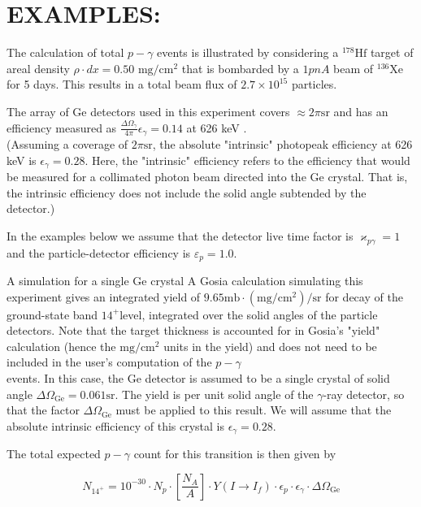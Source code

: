 \documentclass[10pt]{article}
\begin{document}
\section*{EXAMPLES:}
The calculation of total $p-\gamma$ events is illustrated by considering a ${ }^{178} \mathrm{Hf}$ target of areal density $\rho \cdot d x=0.50$ $\mathrm{mg} / \mathrm{cm}^{2}$ that is bombarded by a $1 p n A$ beam of ${ }^{136} \mathrm{Xe}$ for 5 days. This results in a total beam flux of $2.7 \times 10^{15}$ particles.

The array of Ge detectors used in this experiment covers $\approx 2 \pi \mathrm{sr}$ and has an efficiency measured as $\frac{\Delta \Omega_{\gamma}}{4 \pi} \epsilon_{\gamma}=0.14$ at 626 keV .\\
(Assuming a coverage of $2 \pi \mathrm{sr}$, the absolute "intrinsic" photopeak efficiency at 626 keV is $\epsilon_{\gamma}=0.28$. Here, the "intrinsic" efficiency refers to the efficiency that would be measured for a collimated photon beam directed into the Ge crystal. That is, the intrinsic efficiency does not include the solid angle subtended by the detector.)

In the examples below we assume that the detector live time factor is $\varkappa_{p \gamma}=1$ and the particle-detector efficiency is $\varepsilon_{p}=1.0$.

A simulation for a single Ge crystal A Gosia calculation simulating this experiment gives an integrated yield of $9.65 \mathrm{mb} \cdot\left(\mathrm{mg} / \mathrm{cm}^{2}\right) / \mathrm{sr}$ for decay of the ground-state band $14^{+}$level, integrated over the solid angles of the particle detectors. Note that the target thickness is accounted for in Gosia's "yield" calculation (hence the $\mathrm{mg} / \mathrm{cm}^{2}$ units in the yield) and does not need to be included in the user's computation of the $p-\gamma$\\
events. In this case, the Ge detector is assumed to be a single crystal of solid angle $\Delta \Omega_{\mathrm{Ge}}=0.061 \mathrm{sr}$. The yield is per unit solid angle of the $\gamma$-ray detector, so that the factor $\Delta \Omega_{\mathrm{Ge}}$ must be applied to this result. We will assume that the absolute intrinsic efficiency of this crystal is $\epsilon_{\gamma}=0.28$.

The total expected $p-\gamma$ count for this transition is then given by


\begin{equation*}
N_{14^{+}}=10^{-30} \cdot N_{p} \cdot\left[\frac{N_{A}}{A}\right] \cdot Y\left(I \rightarrow I_{f}\right) \cdot \epsilon_{p} \cdot \epsilon_{\gamma} \cdot \Delta \Omega_{\mathrm{Ge}} \tag{6.66}
\end{equation*}
\end{document}
